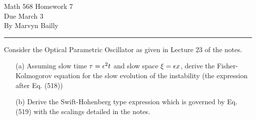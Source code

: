 \documentclass[12pt]{report}
\begin{document}
\large

\begin{center}
 Math 568 Homework 7\\
 Due March 3\\
 By Marvyn Bailly\\
\end{center}

\normalsize




\hrule



\begin{problem}
    Consider the Optical Parametric Oscillator as given in Lecture $23$ of the notes.
    \begin{enumerate}
        \item[(a)]
        Assuming slow time $\tau = {\epsilon}^2 t$ and slow space $\xi = {\epsilon} x$, derive the Fisher-Kolmogorov equation for the slow evolution of the instability (the expression after Eq. (518))
        
        \item[(b)]
        Derive the Swift-Hohenberg type expression which is governed by Eq. (519) with the scalings detailed in the notes.
        
    \end{enumerate} 
\end{problem}
\end{document}
